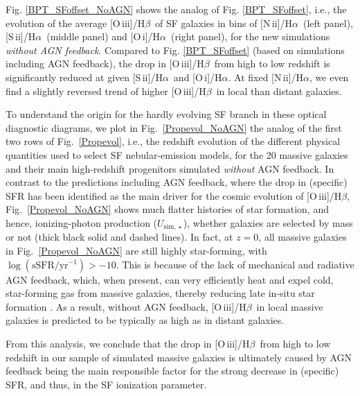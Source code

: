 \documentclass[fleqn,usenatbib]{mnras}
\newcommand{\oiiihb}{\hbox{[O\,{\sc iii}]/H$\beta$}}
\newcommand{\niiha}{\hbox{[N\,{\sc ii}]/H$\alpha$}}
\newcommand{\siiha}{\hbox{[S\,{\sc ii}]/H$\alpha$}}
\newcommand{\oiha}{\hbox{[O\,{\sc i}]/H$\alpha$}}
\begin{document}
\begin{appendix}
  Fig. \ref{BPT_SFoffset_NoAGN} shows the analog of
  Fig. \ref{BPT_SFoffset}, i.e., the evolution of the average \oiiihb\ of SF galaxies
in bins of \niiha\ (left panel), \siiha\ (middle panel) and \oiha\ (right panel), 
for the new simulations {\em without AGN feedback}. Compared to
  Fig. \ref{BPT_SFoffset} (based on simulations including AGN
  feedback), the drop in \oiiihb\ from high to low redshift is significantly
  reduced at given \siiha\ and \oiha. At fixed \niiha, we even
  find a slightly reversed trend of higher \oiiihb\ in local
  than distant galaxies.  

  To understand the origin for the hardly evolving SF branch in these
  optical diagnostic diagrams, we plot in Fig.~\ref{Propevol_NoAGN} the
  analog of the first two rows of Fig.~\ref{Propevol}, i.e., the redshift
  evolution of the different physical quantities used to select SF
  nebular-emission models, for the 20 massive galaxies and their
  main high-redshift progenitors simulated {\em without} AGN
  feedback. In contrast to the predictions including AGN
  feedback, where the drop in (specific) SFR has been identified as the
  main driver for the cosmic evolution of \oiiihb, Fig.~\ref{Propevol_NoAGN}
  shows much flatter histories of star formation, and hence, 
  ionizing-photon production ($U_{\mathrm{sim,}\star}$), whether 
  galaxies are selected by mass or not (thick black solid and dashed
  lines). In fact, at $z=0$, all massive galaxies in Fig.~\ref{Propevol_NoAGN} 
  are still highly star-forming, with $\log(\mathrm{sSFR/yr^{-1}})>-10$.  
  This is because of the lack of mechanical 
  and radiative AGN feedback, which, when present, can very efficiently 
  heat and expel cold, star-forming gas from massive galaxies, thereby 
  reducing late in-situ star formation  \citep[see e.g.][]{Choi15, Choi16}. As 
  a result, without AGN feedback, \oiiihb\ in local massive galaxies is 
  predicted to be typically as high as in distant galaxies.

From this analysis, we conclude that the drop in \oiiihb\  from high to low redshift
in our sample of simulated massive galaxies is ultimately caused by 
AGN feedback being the main responsible factor for the strong decrease in
(specific) SFR, and thus, in the SF ionization parameter.   



\end{appendix}
\end{document}
